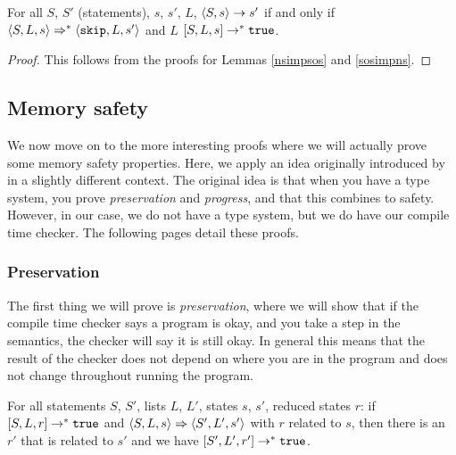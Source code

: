 \begin{theorem}
For all $S$, $S'$ (statements), $s$, $s'$, $L$, $\langle S, s \rangle \to s'$ if and only if $\langle S, L, s \rangle \Rightarrow ^{*} \langle \texttt{skip}, L, s' \rangle$ and $L$ $[ S, L, s ] \to^{*} \texttt{true}$.
\end{theorem}

\begin{proof}
This follows from the proofs for Lemmas \ref{nsimpsos} and \ref{sosimpns}.
\end{proof}

\subsection{Memory safety}
We now move on to the more interesting proofs where we will actually prove some memory safety properties. Here, we apply an idea originally introduced by \cite{wright1994syntactic} in a slightly different context. The original idea is that when you have a type system, you prove \emph{preservation} and \emph{progress}, and that this combines to safety. However, in our case, we do not have a type system, but we do have our compile time checker. The following pages detail these proofs.

\subsubsection*{Preservation}
The first thing we will prove is \emph{preservation}, where we will show that if the compile time checker says a program is okay, and you take a step in the semantics, the checker will say it is still okay. In general this means that the result of the checker does not depend on where you are in the program and does not change throughout running the program. 

\begin{theorem}
\label{preservation}
For all statements $S$, $S'$, lists $L$, $L'$, states $s$, $s'$, reduced states $r$: if $[ S, L, r ] \to ^* \texttt{true}$ and $\langle S, L, s \rangle \Rightarrow \langle S', L', s' \rangle$ with $r$ related to $s$, then there is an $r'$ that is related to $s'$ and we have $[ S', L', r' ] \to ^* \texttt{true}$.
\end{theorem}

